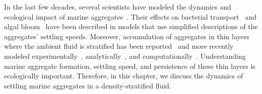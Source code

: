 

In the last few decades, several scientists have modeled the dynamics and ecological impact of marine aggregates~\cite{jackson_aggregation_1998, kiorboe_mechanisms_2002}. 
Their effects on bacterial transport~\cite{jackson_simulation_1989} and algal bloom~\cite{jackson_model_1990} have been described in models that use simplified descriptions of the aggregates' settling speeds. Moreover, accumulation of aggregates in thin layers where the ambient fluid is stratified has been reported~\cite{macintyre_accumulation_1995, alldredge_occurrence_2002} and more recently modeled experimentally~\cite{prairie_delayed_2013}, analytically~\cite{camassa_retention_2013}, and computationally~\cite{panah_simulations_2017}. 
Understanding marine aggregate formation, settling speed, and persistence of these thin layers is ecologically important. 
Therefore, in this chapter, we discuss the dynamics of settling marine aggregates in a density-stratified fluid. 
